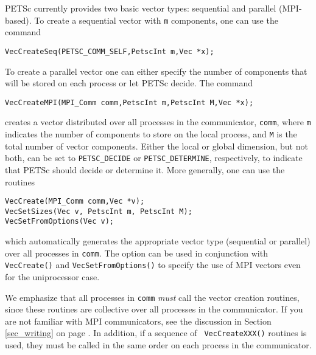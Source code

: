 PETSc currently provides two basic vector types: sequential and parallel
(MPI-based). To create a sequential vector with \lstinline{m} components,
one can use the command
\begin{lstlisting}
VecCreateSeq(PETSC_COMM_SELF,PetscInt m,Vec *x);
\end{lstlisting}
To create a parallel vector one can either specify the number of
components that will be stored on each process or let PETSc decide.
The command
\begin{lstlisting}
VecCreateMPI(MPI_Comm comm,PetscInt m,PetscInt M,Vec *x);
\end{lstlisting}
creates a vector distributed over all processes in the communicator,
\lstinline{comm}, where \lstinline{m} indicates the number
of components to store on the local process, and \lstinline{M} is the
total number of vector components.  Either the local or global
dimension, but not both, can be set to \lstinline{PETSC_DECIDE} or \lstinline{PETSC_DETERMINE}, respectively, to
  indicate that PETSc should decide or determine it.
More generally, one can use the routines
\begin{lstlisting}
VecCreate(MPI_Comm comm,Vec *v);
VecSetSizes(Vec v, PetscInt m, PetscInt M);
VecSetFromOptions(Vec v);
\end{lstlisting}
which automatically generates the appropriate vector type
(sequential or parallel) over all processes in \lstinline{comm}.
The option  can be used in conjunction with
\lstinline{VecCreate()} and \lstinline{VecSetFromOptions()} to specify the use of MPI 
vectors even for the uniprocessor case.

We emphasize that all processes in \lstinline{comm} {\em must} call the
vector creation routines, since these routines are collective over all
processes in the communicator. If you are not familiar with MPI communicators,
see the discussion in Section \ref{sec_writing} on page \pageref{sec_writing}.
In addition, if a sequence of \lstinline{ VecCreateXXX()} routines is used, they must be called in the same
order on each process in the communicator.

